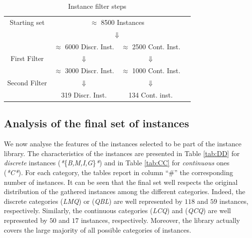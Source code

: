 \begin{table}
 \centering
 \setlength{\tabcolsep}{5pt}
\begin{tabular}{cccc}
Starting set& \multicolumn{ 2}{c}{ $\approx$ 8500 Instances }& \\
& \multicolumn{ 2}{c}{$\Downarrow$}& \\
& $\approx$ 6000 Discr. Inst.  & $\approx$ 2500 Cont. Inst. & \\
First Filter  & $\Downarrow$  & $\Downarrow$ & \\
 & $\approx$ 3000 Discr. Inst.  & $\approx$ 1000 Cont. Inst. & \\
Second Filter & $\Downarrow$  & $\Downarrow$  & \\
  & 319 Discr. Inst.  & 134  Cont. inst. & \\
\end{tabular}
\caption{Instance filter steps} \label{tab:filters}
\end{table}

\subsection{Analysis of the final set of instances}\label{subsec:final set}

We now analyse the features of the instances selected to be part of the
instance library. The characteristics of the instances are presented in Table
\ref{tab:DD} for \emph{discrete} instances
(\textit{*}\{\textit{B,M,I,G}\}\textit{*}) and in Table
\ref{tab:CC} for \emph{continuous} ones (\textit{*C*}).
For each category, the tables
report in column ``$\#$'' the corresponding number of instances. It can be seen
that the final set well respects the original distribution of the gathered
instances among the different categories. Indeed, the discrete categories
(\textit{LMQ}) or (\textit{QBL}) are well represented by $118$ and $59$
instances, respectively. Similarly, the continuous categories
(\textit{LCQ}) and (\textit{QCQ}) are well
represented by $50$ and $17$ instances, respectively. Moreover, the library
actually covers the large majority of all possible categories of instances.

